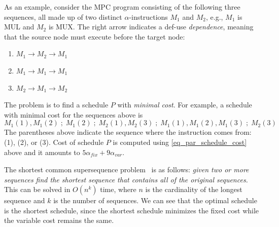 As an example, consider the MPC program consisting of the following three sequences, all made up of two distinct $\alpha$-instructions $M_1$ and $M_2$, e.g., $M_1$ is MUL and $M_2$ is MUX. The right arrow indicates a def-use \emph{dependence}, meaning that the source node must execute before the target node: 

\begin{enumerate}
    \item $M_1 \rightarrow M_2 \rightarrow M_1$
    \item $M_1 \rightarrow M_1 \rightarrow M_1$
    \item $M_2 \rightarrow M_1 \rightarrow M_2$
\end{enumerate} 





The problem is to find a schedule $P$ with \emph{minimal cost}. For example, a schedule with minimal cost for the sequences above is 
\[ 
M_1(1), M_1(2) \; ;\; M_1(2) \; ; \; M_2(1), M_2(3) \; ; \; M_1(1), M_1(2), M_1(3) \; ; \;  M_2(3)
\]
The parentheses above indicate the sequence where the instruction comes from: (1), (2), or (3). 
Cost of schedule $P$ is computed using \cref{eq_par_schedule_cost} above and it amounts to $5\alpha_\mathit{fix} + 9\alpha_\mathit{var}$.

The shortest common supersequence problem~\cite{Vazirani:2010} is as follows: {\it given two or more sequences find the shortest sequence that contains all of the original sequences.} This can be solved in $O(n^k)$ time, where $n$ is the cardinality of the longest sequence and $k$ is the number of sequences. %
We can see that the optimal schedule is the shortest schedule, since the shortest schedule minimizes the fixed cost while the variable cost remains the same.

